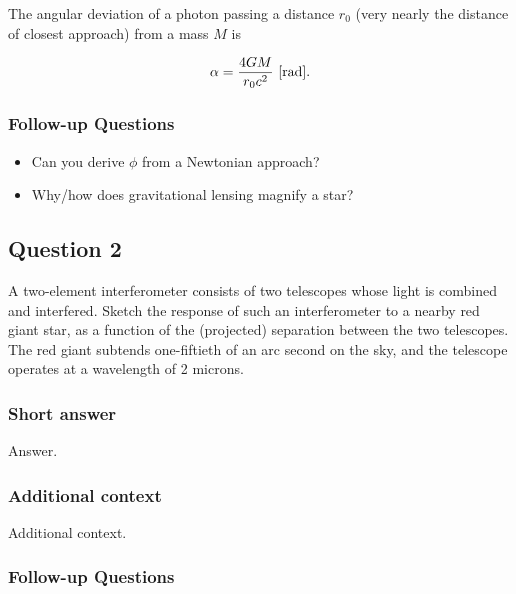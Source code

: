 \documentclass[a4paper,10pt]{article}
\begin{document}
{\noindent}The angular deviation of a photon passing a distance $r_0$ (very nearly the distance of closest approach) from a mass $M$ is

\begin{align*}
    \alpha = \frac{4GM}{r_0c^2} ~ [{\rm rad}].
\end{align*}



\subsubsection{Follow-up Questions}

\begin{itemize}
    \item Can you derive $\phi$ from a Newtonian approach?
    \item Why/how does gravitational lensing magnify a star?
\end{itemize}


\newpage
\subsection{Question 2}

A two-element interferometer consists of two telescopes whose light is combined and interfered. Sketch the response of such an interferometer to a nearby red giant star, as a function of the (projected) separation between the two telescopes. The red giant subtends one-fiftieth of an arc second on the sky, and the telescope operates at a wavelength of 2 microns.

\subsubsection{Short answer}

Answer.

\subsubsection{Additional context}

Additional context.

\subsubsection{Follow-up Questions}
\end{document}
